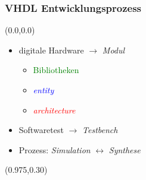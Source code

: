 \documentclass[aspectratio=169, 14pt]{beamer}
\begin{document}
\begin{frame}
    \frametitle{VHDL Entwicklungsprozess}
    \begin{textblock*}{2\paperwidth}(0.0\paperwidth,0.0\paperheight)
        \vspace*{2.0cm}
        \begin{itemize}
            \setlength\itemsep{16pt}
            \item digitale Hardware $\rightarrow$ \textit{Modul}
            \begin{itemize}
                \item \textcolor{green}{Bibliotheken}
                \item \textcolor{blue}{\textit{entity}}
                \item \textcolor{red}{\textit{architecture}}
            \end{itemize}
            \item Softwaretest $\rightarrow$ \textit{Testbench}
            \item Prozess: \textit{Simulation} $\leftrightarrow$ \textit{Synthese}
        \end{itemize}
    \end{textblock*}
    \begin{textblock*}{1.0\paperwidth}(0.975\paperwidth,0.30\paperheight)
    \end{textblock*}

\end{frame}
\end{document}
